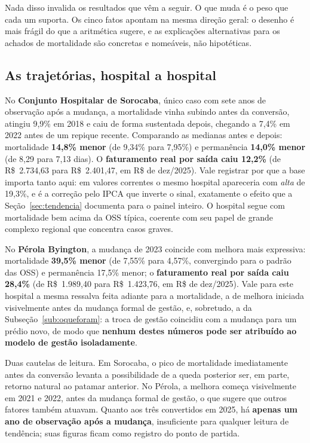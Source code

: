 Nada disso invalida os resultados que vêm a seguir. O que muda é o peso
que cada um suporta. Os cinco fatos apontam na mesma direção geral: o
desenho é mais frágil do que a aritmética sugere, e as explicações
alternativas para os achados de mortalidade são concretas e nomeáveis,
não hipotéticas.

\subsection{As trajetórias, hospital a hospital}

No \textbf{Conjunto Hospitalar de Sorocaba}, único caso com sete anos
de observação após a mudança, a mortalidade vinha subindo antes da
conversão, atingiu 9,9\% em 2018 e caiu de forma sustentada depois,
chegando a 7,4\% em 2022 antes de um repique recente. Comparando as
medianas antes e depois: mortalidade \textbf{14,8\% menor} (de 9,34\%
para 7,95\%) e permanência \textbf{14,0\% menor} (de 8,29 para 7,13
dias). O \textbf{faturamento real por saída caiu 12,2\%} (de
R\$~2.734,63 para R\$~2.401,47, em R\$ de dez/2025). Vale registrar por
que a base importa tanto aqui: em valores correntes o mesmo hospital
apareceria com \emph{alta} de 19,3\%, e é a correção pelo IPCA que
inverte o sinal, exatamente o efeito que a Seção~\ref{sec:tendencia}
documenta para o painel inteiro. O hospital segue com mortalidade bem acima
da OSS típica, coerente com seu papel de grande complexo regional que
concentra casos graves.

No \textbf{Pérola Byington}, a mudança de 2023 coincide com melhora
mais expressiva: mortalidade \textbf{39,5\% menor} (de 7,55\% para
4,57\%, convergindo para o padrão das OSS) e permanência 17,5\% menor;
o \textbf{faturamento real por saída caiu 28,4\%} (de R\$~1.989,40 para
R\$~1.423,76, em R\$ de dez/2025). Vale para este hospital a mesma ressalva
feita adiante para a mortalidade, a de melhora iniciada visivelmente
antes da mudança formal de gestão, e, sobretudo, a da
Subseção~\ref{sub:oqueforam}: a troca de gestão coincidiu com a mudança
para um prédio novo, de modo que \textbf{nenhum destes números pode ser
atribuído ao modelo de gestão isoladamente}.

Duas cautelas de leitura. Em Sorocaba, o pico de mortalidade
imediatamente antes da conversão levanta a possibilidade de a queda
posterior ser, em parte, retorno natural ao patamar anterior. No
Pérola, a melhora começa visivelmente em 2021 e 2022, antes da mudança
formal de gestão, o que sugere que outros fatores também atuavam.
Quanto aos três convertidos em 2025, há \textbf{apenas um ano de
observação após a mudança}, insuficiente para qualquer leitura de
tendência; suas figuras ficam como registro do ponto de partida.

